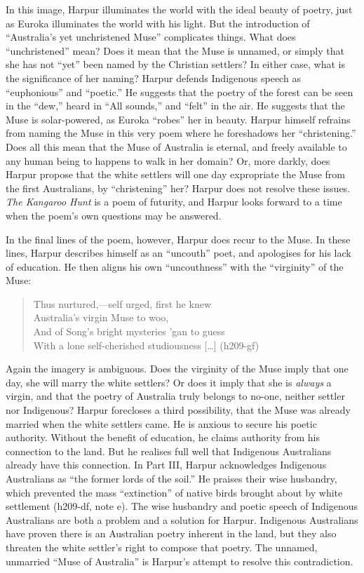 \documentclass[
  Crown,
  times,
  sageh]{sagej}
\begin{document}
In this image, Harpur illuminates the world with the ideal beauty of
poetry, just as Euroka illuminates the world with his light. But the
introduction of ``Australia's yet unchristened Muse'' complicates
things. What does ``unchristened'' mean? Does it mean that the Muse is
unnamed, or simply that she has not ``yet'' been named by the Christian
settlers? In either case, what is the significance of her naming? Harpur
defends Indigenous speech as ``euphonious'' and ``poetic.'' He suggests
that the poetry of the forest can be seen in the ``dew,'' heard in ``All
sounds,'' and ``felt'' in the air. He suggests that the Muse is
solar-powered, as Euroka ``robes'' her in beauty. Harpur himself
refrains from naming the Muse in this very poem where he foreshadows her
``christening.'' Does all this mean that the Muse of Australia is
eternal, and freely available to any human being to happens to walk in
her domain? Or, more darkly, does Harpur propose that the white settlers
will one day expropriate the Muse from the first Australians, by
``christening'' her? Harpur does not resolve these issues. \emph{The
Kangaroo Hunt} is a poem of futurity, and Harpur looks forward to a time
when the poem's own questions may be answered.

In the final lines of the poem, however, Harpur does recur to the Muse.
In these lines, Harpur describes himself as an ``uncouth'' poet, and
apologises for his lack of education. He then aligns his own
``uncouthness'' with the ``virginity'' of the Muse:

\begin{quote}
Thus nurtured,---self urged, first he knew\\
Australia's virgin Muse to woo,\\
And of Song's bright mysteries 'gan to guess\\
With a lone self-cherished studiousness {[}\ldots{]} (h209-gf)
\end{quote}

Again the imagery is ambiguous. Does the virginity of the Muse imply
that one day, she will marry the white settlers? Or does it imply that
she is \emph{always} a virgin, and that the poetry of Australia truly
belongs to no-one, neither settler nor Indigenous? Harpur forecloses a
third possibility, that the Muse was already married when the white
settlers came. He is anxious to secure his poetic authority. Without the
benefit of education, he claims authority from his connection to the
land. But he realises full well that Indigenous Australians already have
this connection. In Part III, Harpur acknowledges Indigenous Australians
as ``the former lords of the soil.'' He praises their wise husbandry,
which prevented the mass ``extinction'' of native birds brought about by
white settlement (h209-df, note e). The wise husbandry and poetic speech
of Indigenous Australians are both a problem and a solution for Harpur.
Indigenous Australians have proven there is an Australian poetry
inherent in the land, but they also threaten the white settler's right
to compose that poetry. The unnamed, unmarried ``Muse of Australia'' is
Harpur's attempt to resolve this contradiction.
\end{document}
